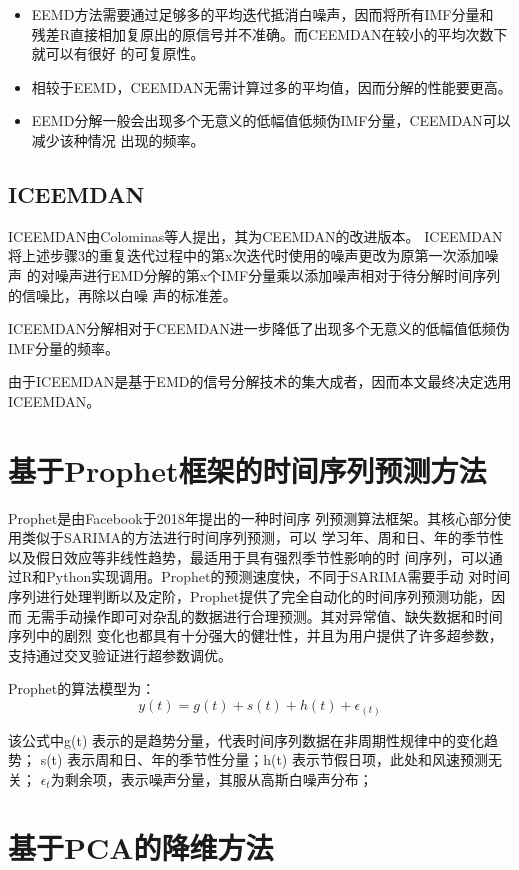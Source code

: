 \documentclass[AutoFakeBold]{LZUThesis}
\begin{document}
\begin{itemize}
\item EEMD方法需要通过足够多的平均迭代抵消白噪声，因而将所有IMF分量和
残差R直接相加复原出的原信号并不准确。而CEEMDAN在较小的平均次数下就可以有很好
的可复原性。
\item 相较于EEMD，CEEMDAN无需计算过多的平均值，因而分解的性能要更高。
\item EEMD分解一般会出现多个无意义的低幅值低频伪IMF分量，CEEMDAN可以减少该种情况
出现的频率。
\end{itemize}

\subsection{ICEEMDAN}

ICEEMDAN由Colominas等人提出\cite{colominas2014improved}，其为CEEMDAN的改进版本。
ICEEMDAN将上述步骤3的重复迭代过程中的第x次迭代时使用的噪声更改为原第一次添加噪声
的对噪声进行EMD分解的第x个IMF分量乘以添加噪声相对于待分解时间序列的信噪比，再除以白噪
声的标准差。

ICEEMDAN分解相对于CEEMDAN进一步降低了出现多个无意义的低幅值低频伪IMF分量的频率。

由于ICEEMDAN是基于EMD的信号分解技术的集大成者，因而本文最终决定选用ICEEMDAN。

\section{基于Prophet框架的时间序列预测方法}
Prophet\cite{taylor2018forecasting}是由Facebook于2018年提出的一种时间序
列预测算法框架。其核心部分使用类似于SARIMA的方法进行时间序列预测，可以
学习年、周和日、年的季节性以及假日效应等非线性趋势，最适用于具有强烈季节性影响的时
间序列，可以通过R和Python实现调用。Prophet的预测速度快，不同于SARIMA需要手动
对时间序列进行处理判断以及定阶，Prophet提供了完全自动化的时间序列预测功能，因而
无需手动操作即可对杂乱的数据进行合理预测。其对异常值、缺失数据和时间序列中的剧烈
变化也都具有十分强大的健壮性，并且为用户提供了许多超参数，支持通过交叉验证进行超参数调优。

Prophet的算法模型为：
$$y(t)=g(t)+s(t)+h(t)+\epsilon_{(t)}$$

该公式中g(t) 表示的是趋势分量，代表时间序列数据在非周期性规律中的变化趋势；
s(t) 表示周和日、年的季节性分量；h(t) 表示节假日项，此处和风速预测无关；
$\epsilon_{t}$为剩余项，表示噪声分量，其服从高斯白噪声分布；

\section{基于PCA的降维方法}
\end{document}
